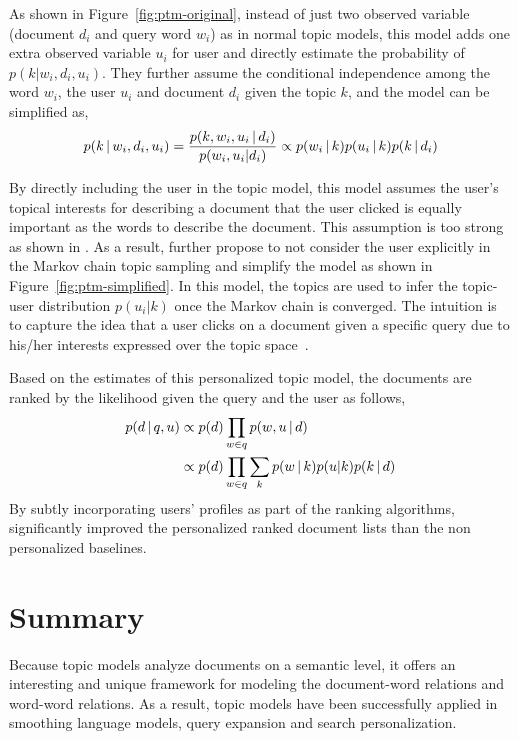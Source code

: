 As shown in Figure~\ref{fig:ptm-original}, instead of just two observed variable (document $d_i$ and query word $w_i$) as in normal topic models, this model adds one extra observed variable $u_i$ for user and directly estimate the probability of $p(k|w_i, d_i, u_i)$. They further assume the conditional independence among the word $w_i$, the user $u_i$ and document $d_i$ given the topic $k$, and the model can be simplified as,
\begin{align}
p(k \, | \, w_i, d_i, u_i) = \frac{p(k,w_i, u_i  \, | \,  d_i)}{p(w_i, u_i | d_i)} \propto p(w_i \, | \, k) p(u_i \, | \, k) p (k \, | \, d_i)
\end{align}

By directly including the user in the topic model, this model assumes the user's topical interests for describing a document that the user clicked is equally important as the words to describe the document. This assumption is too strong as shown in \citet{Carman-2010}. As a result, \citet{Harvey-2013} further propose to not consider the user explicitly in the Markov chain topic sampling and simplify the model as shown in Figure~\ref{fig:ptm-simplified}. In this model, the topics are used to infer the topic-user distribution $p(u_i|k)$ once the Markov chain is converged. The intuition is to capture the idea that a user clicks on a document given a specific query due to his/her interests expressed over the topic space~\citep{Harvey-2013}.

Based on the estimates of this personalized topic model, the documents are ranked by the likelihood given the query and the user as follows,
\begin{align}
p(d  \, | \,  q,u) &\propto p(d) \prod_{w \in q} p(w, u  \, | \,  d)\\
&\propto p(d) \prod_{w \in q} \sum_k p(w \, | \, k) p(u|k) p(k \, | \, d) \notag
\end{align}
By subtly incorporating users' profiles as part of the ranking algorithms, \citet{Harvey-2013} significantly improved the personalized ranked document lists than the non personalized baselines.

\section{Summary}

Because topic models analyze documents on a semantic level, it offers
an interesting and unique framework for modeling the document-word
relations and word-word relations. As a result, topic models have been
successfully applied in smoothing language models, query expansion and search personalization.

